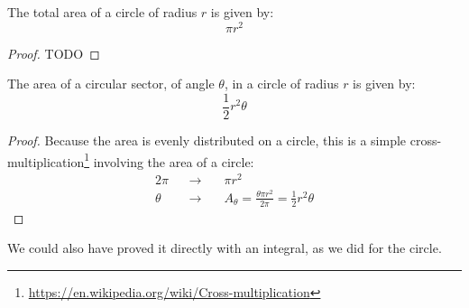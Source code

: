 \documentclass[solutions.tex]{subfiles}
\begin{document}
\begin{theorem} The total area of a circle of
radius $r$ is given by:
\[ \boxed{\pi r^2} \]
\end{theorem}
\begin{proof}
TODO
\end{proof}

\begin{theorem} The area of a circular
sector, of angle $\theta$, in a circle of radius $r$ is given
by:
\[ \boxed{\frac12r^2\theta} \]
\end{theorem}
\begin{proof} Because the area is evenly distributed on a circle,
this is a simple cross-multiplication\footnote{
\url{https://en.wikipedia.org/wiki/Cross-multiplication}} involving
the area of a circle:
\begin{equation*} \begin{aligned}
	2\pi &&\rightarrow\quad& \pi r^2 \\
	\theta &&\rightarrow\quad& A_\theta= \frac{\theta\pi r^2}{2\pi}
		= \boxed{\frac12r^2\theta}
\end{aligned} \end{equation*}
\end{proof}
\begin{remark} We could also have proved it directly with an integral,
as we did for the circle.
\end{remark}
\end{document}
